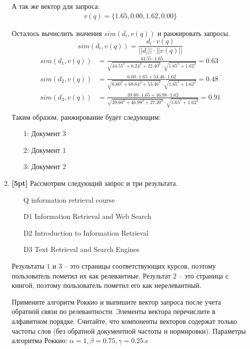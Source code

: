 \begin{enumerate}
	А так же вектор для запроса: 
	\begin{align*}
		v(q) = \{1.65, 0.00, 1.62, 0.00\}
	\end{align*}
	
	Осталось вычислить значения $sim(d_i, v(q))$ и ранжировать запросы.
	\begin{equation*}
		sim (d_i, v(q)) = \frac{d_i \cdot v(q)}{||d_i||\cdot ||v(q)||}
	\end{equation*}
	\begin{align*}
		sim(d_1, v(q)) &= \frac{44.55 \cdot 1.65}{\sqrt{44.55^2 + 6.24^2 + 22.40^2} \cdot 
				\sqrt{1.65^2 + 1.62^2}} = 0.63 \\
		sim(d_2, v(q)) &= \frac{6.60 \cdot 1.65 + 53.46\cdot 1.62}{\sqrt{6.60^2 + 68.64^2 + 
				53.46^2} \cdot \sqrt{1.65^2 + 1.62^2}} = 0.48 \\
		sim(d_3, v(q)) &= \frac{39.60 \cdot 1.65 + 46.98\cdot 1.62}{\sqrt{39.60^2 + 46.98^2 + 
				27.20^2} \cdot \sqrt{1.65^2 + 1.62^2}} = 0.91 \\
	\end{align*}
	Таким образом, ранжирование будет следующим:
	\begin{enumerate}
		\item[1:] Документ 3
		\item[2:] Документ 1
		\item[3:] Документ 2
	\end{enumerate}
	
	\item \textbf{[5pt]} Рассмотрим следующий запрос и три результата.
	\begin{enumerate}
		\item[Q] information retrieval course
		\item[D1] Information Retrieval and Web Search
		\item[D2] Introduction to Information Retrieval
		\item[D3] Text Retrieval and Search Engines
	\end{enumerate}
	
	Результаты $1$ и $3$ – это страницы соответствующих курсов, поэтому пользователь пометил их 
	как релевантные. Результат $2$ – это страница с книгой, поэтому пользователь пометил его как 
	нерелевантный.
	
	Примените алгоритм Роккио и выпишите вектор запроса после учета обратной связи по 
	релевантности. Элементы вектора перечислите в алфавитном порядке. Считайте, что компоненты 
	векторов содержат только частоты слов (без обратной документной частоты и нормировки). 
	Параметры алгоритма Роккио: $\alpha = 1, \beta = 0.75, \gamma = 0.25.$s


\end{enumerate}
